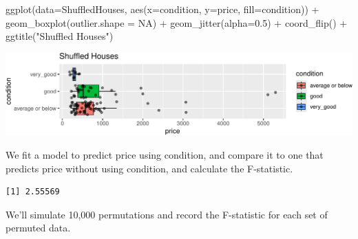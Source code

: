 \documentclass[
  letterpaper,
  DIV=11,
  numbers=noendperiod]{scrreprt}
\newenvironment{Shaded}{\begin{snugshade}}{\end{snugshade}}
\newcommand{\AttributeTok}[1]{\textcolor[rgb]{0.40,0.45,0.13}{#1}}
\newcommand{\ConstantTok}[1]{\textcolor[rgb]{0.56,0.35,0.01}{#1}}
\newcommand{\DecValTok}[1]{\textcolor[rgb]{0.68,0.00,0.00}{#1}}
\newcommand{\FloatTok}[1]{\textcolor[rgb]{0.68,0.00,0.00}{#1}}
\newcommand{\FunctionTok}[1]{\textcolor[rgb]{0.28,0.35,0.67}{#1}}
\newcommand{\NormalTok}[1]{\textcolor[rgb]{0.00,0.23,0.31}{#1}}
\newcommand{\OtherTok}[1]{\textcolor[rgb]{0.00,0.23,0.31}{#1}}
\newcommand{\SpecialCharTok}[1]{\textcolor[rgb]{0.37,0.37,0.37}{#1}}
\newcommand{\StringTok}[1]{\textcolor[rgb]{0.13,0.47,0.30}{#1}}
\begin{document}
\begin{Shaded}
\begin{Highlighting}[]
\FunctionTok{ggplot}\NormalTok{(}\AttributeTok{data=}\NormalTok{ShuffledHouses, }\FunctionTok{aes}\NormalTok{(}\AttributeTok{x=}\NormalTok{condition, }\AttributeTok{y=}\NormalTok{price, }\AttributeTok{fill=}\NormalTok{condition)) }\SpecialCharTok{+} 
  \FunctionTok{geom\_boxplot}\NormalTok{(}\AttributeTok{outlier.shape =} \ConstantTok{NA}\NormalTok{) }\SpecialCharTok{+} \FunctionTok{geom\_jitter}\NormalTok{(}\AttributeTok{alpha=}\FloatTok{0.5}\NormalTok{) }\SpecialCharTok{+} \FunctionTok{coord\_flip}\NormalTok{() }\SpecialCharTok{+} \FunctionTok{ggtitle}\NormalTok{(}\StringTok{"Shuffled Houses"}\NormalTok{)}
\end{Highlighting}
\end{Shaded}

\includegraphics{Ch3_files/figure-pdf/unnamed-chunk-242-1.pdf}

We fit a model to predict price using condition, and compare it to one
that predicts price without using condition, and calculate the
F-statistic.

\begin{Shaded}
\end{Shaded}

\begin{verbatim}
[1] 2.55569
\end{verbatim}

We'll simulate 10,000 permutations and record the F-statistic for each
set of permuted data.
\end{document}
